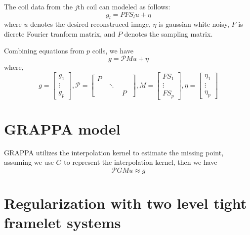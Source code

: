 \documentclass[UTF8]{article}
\begin{document}
\par The coil data from the $j$th coil can modeled as follows:
\begin{equation}\label{eq:coil_equation}
	g_l = PFS_lu + \eta
\end{equation}
where $u$ denotes the desired reconstruced image, $\eta$ is gaussian white noisy, $F$ is dicrete Fourier tranform matrix, and $P$ denotes the sampling matrix. 
\par Combining equations from $p$ coils, we have 
\begin{equation}\label{eq:system_equation}
	g = \mathcal{P}Mu + \eta
\end{equation}
where,
\begin{equation*}
	g = \begin{bmatrix}
		g_1 \\
		\vdots \\
		g_p
	\end{bmatrix},
   \mathcal{P} = \begin{bmatrix}
	   	P & \quad&\quad \\
	   	\quad& \ddots &\quad \\
	   	\quad& \quad& P
   \end{bmatrix},
	M = \begin{bmatrix}
		FS_1 \\
		\vdots \\
		FS_p
	\end{bmatrix},
	\eta =\begin{bmatrix}
		\eta_1 \\
		\vdots \\
		\eta_p
	\end{bmatrix}
\end{equation*}
\section{GRAPPA model}
\par GRAPPA utilizes the interpolation kernel to estimate the missing point, assuming we use $G$ to represent the interpolation kernel, then we have
\begin{equation} \label{GRAPPA_equation}
	\mathcal{P}GMu \approx g
\end{equation}

\section{Regularization with two level tight framelet systems}
\end{document}
